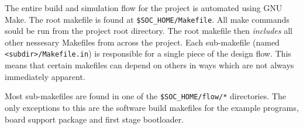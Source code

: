 
The entire build and simulation flow for the \SCARVSOC project is
automated using GNU Make.
The root makefile is found at {\tt \$SOC\_HOME/Makefile}.
All make commands sould be run from the project root directory.
The root makefile then {\em includes} all other nessesary Makefiles
from across the project.
Each sub-makefile (named {\tt <subdir>/Makefile.in}) is responsible for
a single piece of the design flow.
This means that certain makefiles can depend on others in ways which
are not always immediately apparent.

Most sub-makefiles are found in one of the {\tt \$SOC\_HOME/flow/*}
directories.
The only exceptions to this are the software build makefiles for
the example programs, board support package and first stage bootloader.

